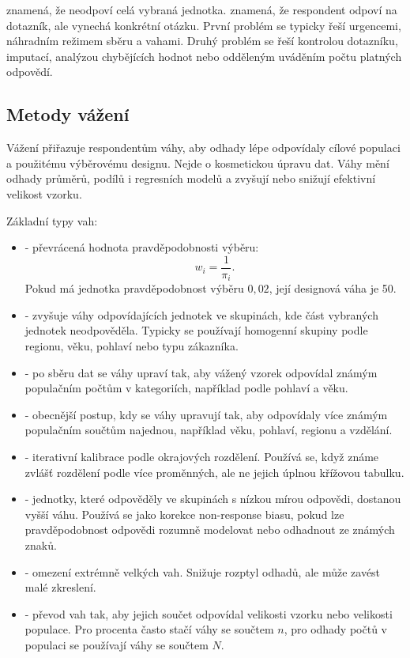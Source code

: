  znamená, že neodpoví celá vybraná jednotka.  znamená,
že respondent odpoví na dotazník, ale vynechá konkrétní otázku. První problém se typicky řeší
urgencemi, náhradním režimem sběru a vahami. Druhý problém se řeší kontrolou dotazníku, imputací,
analýzou chybějících hodnot nebo odděleným uváděním počtu platných odpovědí.

\subsection{Metody vážení}
Vážení přiřazuje respondentům váhy, aby odhady lépe odpovídaly cílové populaci a použitému výběrovému
designu. Nejde o kosmetickou úpravu dat. Váhy mění odhady průměrů, podílů i regresních modelů a
zvyšují nebo snižují efektivní velikost vzorku.

Základní typy vah:
\begin{itemize}
  \item {} - převrácená hodnota pravděpodobnosti výběru:
  \[
    w_i = \frac{1}{\pi_i}.
  \]
  Pokud má jednotka pravděpodobnost výběru \(0{,}02\), její designová váha je 50.
  \item {} - zvyšuje váhy odpovídajících jednotek ve skupinách, kde část
  vybraných jednotek neodpověděla. Typicky se používají homogenní skupiny podle regionu, věku,
  pohlaví nebo typu zákazníka.
  \item {} - po sběru dat se váhy upraví tak, aby vážený vzorek odpovídal známým
  populačním počtům v kategoriích, například podle pohlaví a věku.
  \item {} - obecnější postup, kdy se váhy upravují tak, aby odpovídaly více známým
  populačním součtům najednou, například věku, pohlaví, regionu a vzdělání.
  \item {} - iterativní kalibrace podle okrajových rozdělení. Používá se, když známe
  zvlášť rozdělení podle více proměnných, ale ne jejich úplnou křížovou tabulku.
  \item {} - jednotky, které odpověděly ve skupinách
  s nízkou mírou odpovědi, dostanou vyšší váhu. Používá se jako korekce non-response biasu, pokud
  lze pravděpodobnost odpovědi rozumně modelovat nebo odhadnout ze známých znaků.
  \item {} - omezení extrémně velkých vah. Snižuje rozptyl odhadů, ale může zavést
  malé zkreslení.
  \item {} - převod vah tak, aby jejich součet odpovídal velikosti vzorku nebo
  velikosti populace. Pro procenta často stačí váhy se součtem \(n\), pro odhady počtů v populaci
  se používají váhy se součtem \(N\).
\end{itemize}

